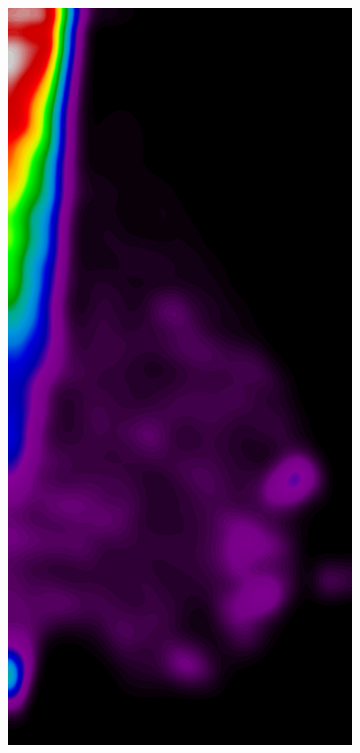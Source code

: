 \begin{figure}[h!]
	\centering
	\begin{subfigure}{0.195\textwidth}
		\centering
			\includegraphics[width=\textwidth]{plots/examples/example1_probs_1_1.png}

\end{subfigure}
\end{figure}
